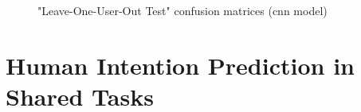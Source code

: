 \begin{figure}[ht]
   \centering
   \begin{subfigure}[b]{0.32\columnwidth}
       {\fontsize{8}{10}\selectfont}
       \caption{\centering}
   \end{subfigure} \
   \begin{subfigure}[b]{0.32\columnwidth}
       {\fontsize{8}{10}\selectfont}
       \caption{\centering}
   \end{subfigure} \
   \begin{subfigure}[b]{0.32\columnwidth}
       {\fontsize{8}{10}\selectfont}
       \caption{\centering}
   \end{subfigure}
   \caption{"Leave-One-User-Out Test" confusion matrices (\acs{cnn} model)}
   \label{fig:conf_matrix_examplesC_v2}
\end{figure}


\section{Human Intention Prediction in Shared Tasks}
\label{section:human_intention_prediction}

